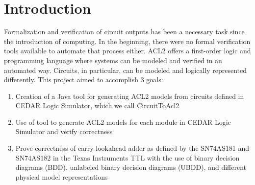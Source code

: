 \documentclass[fleqn,10pt]{SelfArx} %
\affiliation{\textsuperscript{1}\textit{Department of Computer Science, University of Texas at Austin}} %
\begin{document}
\flushbottom %

\maketitle %

\tableofcontents %

\thispagestyle{empty} %


\section*{Introduction} %

Formalization and verification of circuit outputs has been a necessary task since the 
introduction of computing. In the beginning, there were no formal verification tools available 
to automate that process either. ACL2 offers a first-order logic and programming language
where systems can be modeled and verified in an automated way. Circuits, in particular, can 
be modeled and logically represented differently. 
This project aimed to accomplish 3 goals:

\begin{enumerate}
\item Creation of a Java tool for generating ACL2 models from circuits defined in CEDAR Logic Simulator, which we call CircuitToAcl2
\item Use of tool to generate ACL2 models for each module in CEDAR Logic Simulator and verify correctness
\item Prove correctness of carry-lookahead adder as defined by the SN74AS181 and SN74AS182 in the Texas Instruments TTL with the use of binary decision diagrams (BDD), unlabeled binary decision diagrams (UBDD), and different physical model representations
\end{enumerate}

\end{document}
